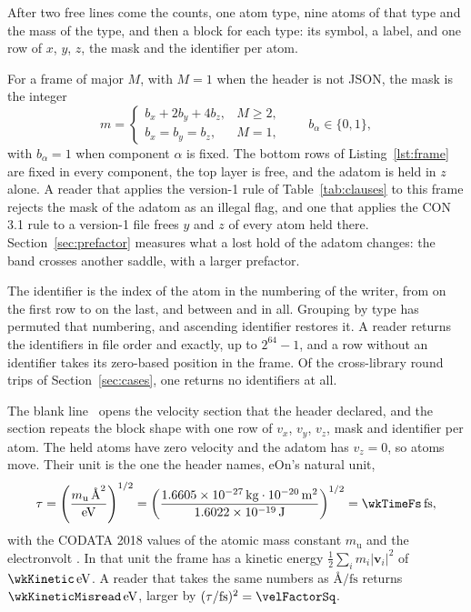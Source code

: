 \documentclass[preprint,12pt]{elsarticle}
\begin{document}
After two free lines come the counts, one atom type, nine atoms of that
type and the mass of the type, and then a block for each type: its
symbol, a label, and one row of \(x\), \(y\), \(z\), the mask and the
identifier per atom.

For a frame of major \(M\), with \(M=1\) when the header is not JSON,
the mask is the integer
\begin{equation}
\label{eq:mask}
m =
\begin{cases}
b_x + 2 b_y + 4 b_z, & M\ge 2,\\
b_x = b_y = b_z, & M = 1,
\end{cases}
\qquad b_\alpha\in\{0,1\},
\end{equation}
with \(b_\alpha=1\) when component \(\alpha\) is fixed.
The bottom rows of Listing~\ref{lst:frame} are fixed in every component,
the top layer is free, and the adatom is held in \(z\) alone.
A reader that applies the version-1 rule of Table~\ref{tab:clauses} to
this frame rejects the mask of the adatom as an illegal flag, and one
that applies the CON 3.1 rule to a version-1 file frees \(y\) and \(z\)
of every atom held there.
Section~\ref{sec:prefactor} measures what a lost hold of the adatom
changes: the band crosses another saddle, with a larger prefactor.

The identifier is the index of the atom in the numbering of the writer,
from \wkIdFirst{} on the first row to \wkIdLast{} on the last, and
between \wkIdLow{} and \wkIdHigh{} in all.
Grouping by type has permuted that numbering, and ascending identifier
restores it.
A reader returns the identifiers in file order and exactly, up to
\(2^{64}-1\), and a row without an identifier takes its zero-based
position in the frame.
Of the cross-library round trips of Section~\ref{sec:cases}, one returns
no identifiers at all.

The blank line~\wkLineBlank{} opens the velocity section that the header
declared, and the section repeats the block shape with one row of
\(v_x\), \(v_y\), \(v_z\), mask and identifier per atom.
The held atoms have zero velocity and the adatom has \(v_z=0\), so
\wkMovingAtoms{} atoms move.
Their unit is the one the header names, eOn's natural unit,
\begin{equation}
\label{eq:tau}
\tau=\left(\frac{m_{\mathrm{u}}\,\text{\AA}^{2}}{\mathrm{eV}}\right)^{1/2}
=\left(\frac{1.6605\times10^{-27}\,\mathrm{kg}\cdot 10^{-20}\,\mathrm{m}^{2}}{1.6022\times10^{-19}\,\mathrm{J}}\right)^{1/2}
=\wkTimeFs\,\mathrm{fs},
\end{equation}
with the CODATA 2018 values of the atomic mass constant
\(m_{\mathrm{u}}\) and the electronvolt
\cite{tiesingaCodataRecommendedValues2021}.
In that unit the frame has a kinetic energy
\(\tfrac{1}{2}\sum_i m_i\lvert\mathbf{v}_i\rvert^2\) of
\(\wkKinetic\,\mathrm{eV}\).
A reader that takes the same numbers as \(\text{\AA}/\mathrm{fs}\)
returns \(\wkKineticMisread\,\mathrm{eV}\), larger by
\((\tau/\mathrm{fs})^2=\velFactorSq\).
\end{document}
